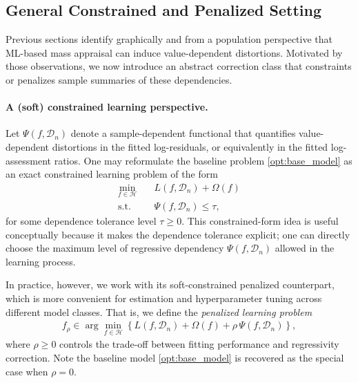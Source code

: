 \documentclass[12pt, draft]{article}
\theoremstyle{plain}
\theoremstyle{definition}
\newcommand{\1}{\mathbf{1}}
\newcommand{\D}{\mathcal{D}}
\renewcommand{\H}{\mathcal{H}}
\begin{document}


\subsection{General Constrained and Penalized Setting}
\label{subsec:general_penalized_setting}

Previous sections identify graphically and from a population perspective that ML-based mass appraisal can induce value-dependent distortions. Motivated by those observations, we now introduce an abstract correction class that constraints or penalizes sample summaries of these dependencies.

\paragraph{A (soft) constrained learning perspective.} Let $\Psi(f, \D_n)$ denote a sample-dependent functional that quantifies value-dependent distortions in the fitted log-residuals, or equivalently in the fitted log-assessment ratios. One may reformulate the baseline problem \eqref{opt:base_model} as an exact constrained learning problem of the form
\begin{align}
\label{opt:general_constrained_model}
\min_{f\in\H}
\quad
& L(f, \D_n)+\Omega(f)
\\
\text{s.t.}\quad
& \Psi(f, \D_n)\le \tau,
\nonumber
\end{align}
for some dependence tolerance level $\tau\ge 0$. This constrained-form idea is useful conceptually because it makes the dependence tolerance explicit; one can directly choose the maximum level of regressive dependency $\Psi(f, \D_n)$ allowed in the learning process. 


In practice, however, we work with its soft-constrained penalized counterpart, which is more convenient for estimation and hyperparameter tuning across different model classes. That is, we define the \textit{penalized learning problem}
\begin{align}
\label{opt:general_penalized_model}
f_\rho
\in
\arg\min_{f\in\H}
\left\{
L(f, \D_n)+\Omega(f)+\rho\,\Psi(f, \D_n)
\right\},
\end{align}
where $\rho\ge 0$ controls the trade-off between fitting performance and regressivity correction. Note the baseline model \eqref{opt:base_model} is recovered as the special case when $\rho=0$.
\end{document}
